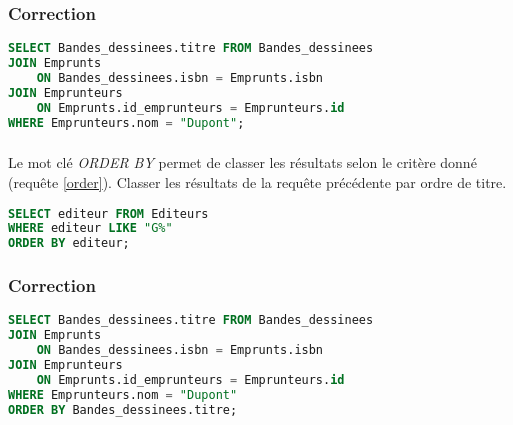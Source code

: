 \documentclass[svgnames,11pt]{beamer}
\begin{document}
\begin{frame}[fragile]
    \frametitle{Correction}
\begin{center}
\begin{lstlisting}[language=SQL , basicstyle=\ttfamily\small, xleftmargin=1em, xrightmargin=0em]
SELECT Bandes_dessinees.titre FROM Bandes_dessinees
JOIN Emprunts
    ON Bandes_dessinees.isbn = Emprunts.isbn
JOIN Emprunteurs 
    ON Emprunts.id_emprunteurs = Emprunteurs.id
WHERE Emprunteurs.nom = "Dupont";
\end{lstlisting}
\end{center}

\end{frame}
\begin{frame}[fragile]
    \frametitle{}

\begin{activite}
Le mot clé \emph{ORDER BY} permet de classer les résultats selon le critère donné (requête \ref{order}). Classer les résultats de la requête précédente par ordre de titre.
\begin{center}
\begin{lstlisting}[language=SQL , basicstyle=\ttfamily\small, xleftmargin=1em, xrightmargin=0em]
SELECT editeur FROM Editeurs 
WHERE editeur LIKE "G%"
ORDER BY editeur;
\end{lstlisting}
\label{order}
\end{center}
\end{activite}

\end{frame}
\begin{frame}[fragile]
    \frametitle{Correction}
\begin{center}
\begin{lstlisting}[language=SQL , basicstyle=\ttfamily\small, xleftmargin=1em, xrightmargin=0em]
SELECT Bandes_dessinees.titre FROM Bandes_dessinees
JOIN Emprunts
    ON Bandes_dessinees.isbn = Emprunts.isbn
JOIN Emprunteurs 
    ON Emprunts.id_emprunteurs = Emprunteurs.id
WHERE Emprunteurs.nom = "Dupont"
ORDER BY Bandes_dessinees.titre;
\end{lstlisting}
\end{center}

\end{frame}
\end{document}
